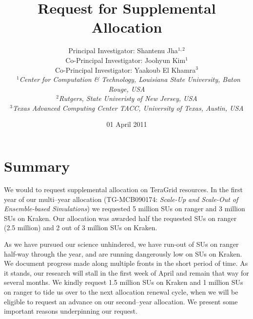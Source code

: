\documentclass[a4paper,10pt]{article}
\begin{document}
\title{\Large Request for Supplemental Allocation}

\author{Principal Investigator: Shantenu Jha$^{1,2}$ \\ Co-Principal Investigator: Joohyun Kim$^{1}$ \\ Co-Principal Investigator: Yaakoub El Khamra$^{3}$\\\
   \small{\emph{$^{1}$Center for Computation \& Technology, Louisiana State University, Baton Rouge,
USA}}
\\
  \small{\emph{$^{2}$Rutgers, State Univeristy of New Jersey, USA}}
\\
  \small{\emph{$^{3}$Texas Advanced Computing Center TACC, University of Texas, Austin, USA}}}

\newif\ifdraft
\drafttrue
\ifdraft
\newcommand{\amnote}[1]{ {\textcolor{magenta} { ***AM: #1c }}}
\newcommand{\jhanote}[1]{ {\textcolor{red} { ***SJ: #1 }}}
\newcommand{\yyenote}[1]{ {\textcolor{blue} { ***YYE: #1 }}}
\newcommand{\michaelnote}[1]{ {\textcolor{blue} { ***MM: #1 }}}
\else
\newcommand{\amnote}[1]{}
\newcommand{\jhanote}[1]{}
\newcommand{\yyenote}[1]{}
\newcommand{\michaelnote}[1]{ {\textcolor{blue} { ***MM: #1 }}}
\fi


\date{01 April 2011}

\maketitle

\section{Summary}

We would to request supplemental allocation on TeraGrid resources. In the first year of our multi--year allocation (TG-MCB090174: {\it Scale-Up and Scale-Out of Ensemble-based Simulations}) we requested 5 million SUs on ranger and 3 million SUs on Kraken. Our allocation was awarded half the requested SUs on ranger (2.5 million) and 2 out of 3 million SUs on Kraken.

As we have pursued our science unhindered, we have run-out of SUs on
ranger half-way through the year, and are running dangerously low on
SUs on Kraken.  We document progress made along multiple fronts in the
short period of time.  As it stands, our research will stall in the
first week of April and remain that way for several months.  We kindly
request 1.5 million SUs on Kraken and 1 million SUs on ranger to tide
us over to the next allocation renewal cycle, when we will be eligible
to request an advance on our second--year allocation.  We present some
important reasons underpinning our request.
\end{document}
